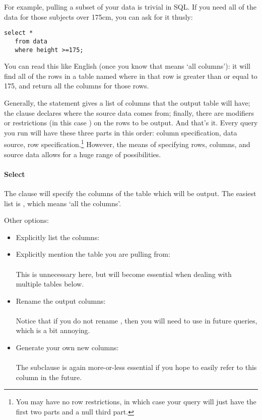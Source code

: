 For example, pulling a subset of your data is trivial in SQL. If
you need all of the data for those subjects over 175cm, you can ask for
it thusly:
\begin{lstlisting}
select * 
   from data 
   where height >=175;
\end{lstlisting}

You can read this like English (once you know that \sinline{*} means `all
columns'): it will find all of the rows in a table named 
where  in that row is greater than or equal to 175, and
return all the columns for those rows.


Generally, the  statement gives a list of columns that
the output table will have; the  clause declares where the
source data comes from; finally, there are modifiers or restrictions
(in this case ) on the rows to be output.  And that's
it. Every query you run will have these three parts in this order: column
specification, data source, row specification.\footnote{You may have no
row restrictions, in which case your query will just have the first two
parts and a null third part.} However, the means of specifying rows,
columns, and source data allows for a huge range of possibilities.

\paragraph{Select}
The  clause will specify the columns of the table which will
be output. The easiest list is \sinline{*}, which means `all the columns'.

Other options:\begin{itemize}
\item Explicitly list the columns:\\ 
\item Explicitly mention the table you are pulling from:\\
\\
This is unnecessary here, but will become
essential when dealing with multiple tables below.
\item Rename the output columns:\\
\\ 
Notice that if you do not rename , then you will need to use  in future
queries, which is a
bit annoying.
\item Generate your own new columns:\\
\\
The  subclause is again more-or-less
essential if you hope to easily refer to this column in the future. 
\end{itemize}

